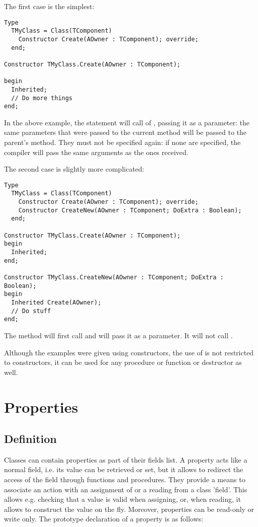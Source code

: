 The first case is the simplest:
\begin{verbatim}
Type
  TMyClass = Class(TComponent)
    Constructor Create(AOwner : TComponent); override;
  end;

Constructor TMyClass.Create(AOwner : TComponent); 

begin
  Inherited;
  // Do more things
end;
\end{verbatim}
In the above example, the  statement will call 
of , passing it  as a parameter: the same
parameters that were passed to the current method will be passed to the
parent's method. They must not be specified again: if none are specified,
the compiler will pass the same arguments as the ones received.

The second case is slightly more complicated:
\begin{verbatim}
Type
  TMyClass = Class(TComponent)
    Constructor Create(AOwner : TComponent); override;
    Constructor CreateNew(AOwner : TComponent; DoExtra : Boolean);
  end;

Constructor TMyClass.Create(AOwner : TComponent); 
begin
  Inherited;
end;

Constructor TMyClass.CreateNew(AOwner : TComponent; DoExtra : Boolean); 
begin
  Inherited Create(AOwner);
  // Do stuff
end;
\end{verbatim}
The  method will first call  and
will pass it  as a parameter. It will not call
.

Although the examples were given using constructors, the use of
 is not restricted to constructors, it can be used
for any procedure or function or destructor as well.

\section{Properties}
\subsection{Definition}
Classes can contain properties as part of their fields list. A property
acts like a normal field, i.e. its value can be retrieved or set, but it
allows to redirect the access of the field through functions and
procedures. They provide a means to associate an action with an assignment
of or a reading from a class 'field'. This allows e.g. checking that a
value is valid when assigning, or, when reading, it allows to construct the
value on the fly. Moreover, properties can be read-only or write only.
The prototype declaration of a property is as follows:


